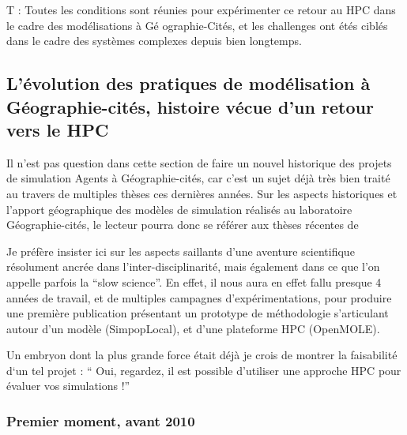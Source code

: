 T : Toutes les conditions sont réunies pour expérimenter ce retour au HPC dans le cadre des modélisations à Gé
ographie-Cités, et les challenges ont étés ciblés dans le cadre des systèmes complexes depuis bien longtemps.

\subsection{L'évolution des pratiques de modélisation à Géographie-cités, histoire vécue d'un retour vers le HPC}
\label{ssec:hist_pratiques}


Il n'est pas question dans cette section de faire un nouvel historique des projets de simulation Agents à Géographie-cités, car c'est un sujet déjà très bien traité au travers de multiples thèses ces dernières années. Sur les aspects historiques et l'apport géographique des modèles de simulation réalisés au laboratoire Géographie-cités, le lecteur pourra donc se référer aux thèses récentes de \autocites{Glisse2007, Louail2010, Schmitt2014, Cottineau2014b}

Je préfère insister ici sur les aspects saillants d'une aventure scientifique résolument ancrée dans l'inter-disciplinarité, mais également dans ce que l'on appelle parfois la \foreignquote{english}{slow science}. En effet, il nous aura en effet fallu presque 4 années de travail, et de multiples campagnes d'expérimentations, pour produire une première publication \autocite{Schmitt2015} présentant un prototype de méthodologie s'articulant autour d'un modèle (SimpopLocal), et d'une plateforme HPC (OpenMOLE).

Un embryon dont la plus grande force était déjà je crois de montrer la faisabilité d`un tel projet : \enquote{ Oui, regardez, il est possible d'utiliser une approche HPC pour évaluer vos simulations !}


\subsubsection{Premier moment, avant 2010}
\label{sssec:premier_moment}

